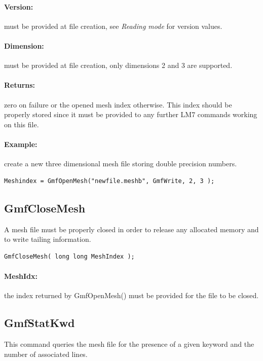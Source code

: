 \documentclass[a4paper,12pt]{article}
\begin{document}
\paragraph{Version:}
must be provided at file creation, see \emph{Reading mode} for version values.

\paragraph{Dimension:}
must be provided at file creation, only dimensions 2 and 3 are supported.

\paragraph{Returns:}
zero on failure or the opened mesh index otherwise. This index should be properly stored since it must be provided to any further LM7 commands working on this file.

\paragraph{Example:} create a new three dimensional mesh file storing double precision numbers.

\begin{tt}
\begin{verbatim}
Meshindex = GmfOpenMesh("newfile.meshb", GmfWrite, 2, 3 );
\end{verbatim}
\end{tt}
\normalfont


\subsection{GmfCloseMesh}
A mesh file must be properly closed in order to release any allocated memory and to write tailing information.

\begin{tt}
\begin{verbatim}
GmfCloseMesh( long long MeshIndex );
\end{verbatim}
\end{tt}
\normalfont

\paragraph{MeshIdx:}
the index returned by GmfOpenMesh() must be provided for the file to be closed.


\subsection{GmfStatKwd}
This command queries the mesh file for the presence of a given keyword and the number of associated lines.
\end{document}
